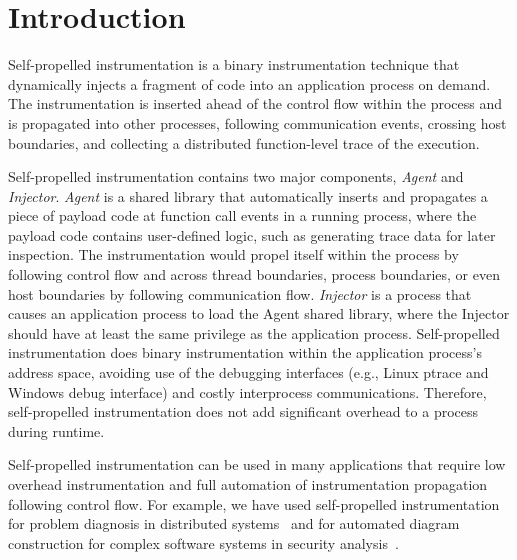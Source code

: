 \section{Introduction}
\label{sec-intro}

Self-propelled instrumentation is a binary instrumentation technique that
dynamically injects a fragment of code into an application process on
demand.
The instrumentation is inserted ahead of the control flow within the process and
is propagated into other processes, following communication events, crossing
host boundaries, and collecting a distributed function-level trace of the
execution.

Self-propelled instrumentation contains two major components, {\em Agent} and
{\em Injector}.
{\em Agent} is a shared library that automatically inserts and propagates a
piece of payload code at function call events in a running process, where the
payload code contains user-defined logic, such as generating trace data for
later inspection.
The instrumentation would propel itself within the process by following control
flow and across thread boundaries, process boundaries, or even host boundaries
by following communication flow.
{\em Injector} is a process that causes an application process to load the Agent
shared library, where the Injector should have at least the same privilege as
the application process.
Self-propelled instrumentation does binary instrumentation within the
application process's address space, avoiding use of the debugging interfaces
(e.g., Linux ptrace and Windows debug interface) and costly interprocess
communications.
Therefore, self-propelled instrumentation does not add significant overhead to a
process during runtime.

Self-propelled instrumentation can be used in many applications that require low
overhead instrumentation and full automation of instrumentation propagation
following control flow.
For example, we have used self-propelled instrumentation for problem diagnosis
in distributed systems~\cite{Mirgorodskiy2006} and for automated diagram
construction for complex software systems in security analysis~\cite{Fang2012}.
